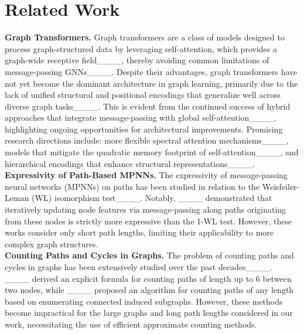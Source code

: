 \section{Related Work}
\label{sec:rw}
\textbf{Graph Transformers.} Graph transformers are a class of models designed to process graph-structured data by leveraging self-attention, which provides a graph-wide receptive field____, thereby avoiding common limitations of message-passing GNNs____. Despite their advantages, graph transformers have not yet become the dominant architecture in graph learning, primarily due to the lack of unified structural and positional encodings that generalize well across diverse graph tasks____. This is evident from the continued success of hybrid approaches that integrate message-passing with global self-attention____, highlighting ongoing opportunities for architectural improvements. Promising research directions include: more flexible spectral attention mechanisms____, models that mitigate the quadratic memory footprint of self-attention____, and hierarchical encodings that enhance structural representations____. \\
\textbf{Expressivity of Path-Based MPNNs.} The expressivity of message-passing neural networks (MPNNs) on paths has been studied in relation to the Weisfeiler-Leman (WL) isomorphism test____. Notably, ____ demonstrated that iteratively updating node features via message-passing along paths originating from these nodes is strictly more expressive than the 1-WL test. However, these works consider only short path lengths, limiting their applicability to more complex graph structures. \\
\textbf{Counting Paths and Cycles in Graphs.} The problem of counting paths and cycles in graphs has been extensively studied over the past decades____. ____ derived an explicit formula for counting paths of length up to 6 between two nodes, while ____ proposed an algorithm for counting paths of any length based on enumerating connected induced subgraphs. However, these methods become impractical for the large graphs and long path lengths considered in our work, necessitating the use of efficient approximate counting methods.